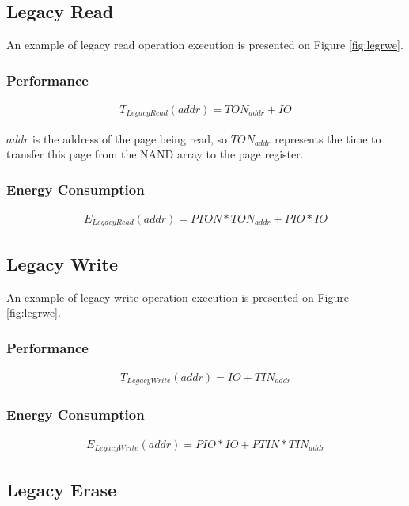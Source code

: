 \documentclass[oneside]{memoir}
\begin{document}
\subsection{Legacy Read}

An example of legacy read operation execution is presented on Figure \ref{fig:legrwe}.

\subsubsection{Performance}

\begin{align} T_{LegacyRead}(addr) = TON_{addr} + IO \end{align}

$addr$ is the address of the page being read, so $TON_{addr}$ represents the time to transfer this page from the NAND array to the page register.

\subsubsection{Energy Consumption}

\begin{align} E_{LegacyRead}(addr) = PTON*TON_{addr} + PIO*IO \end{align}

\subsection{Legacy Write}

An example of legacy write operation execution is presented on Figure \ref{fig:legrwe}.

\subsubsection{Performance}

\begin{align} T_{LegacyWrite}(addr) = IO + TIN_{addr} \end{align}

\subsubsection{Energy Consumption}

\begin{align} E_{LegacyWrite}(addr) = PIO*IO + PTIN*TIN_{addr} \end{align}

\subsection{Legacy Erase}
\end{document}
